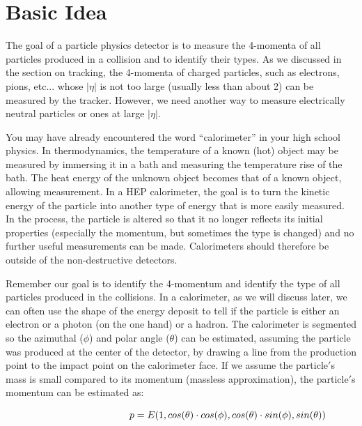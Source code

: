\section{Basic Idea}

\noindent
The goal of a particle physics detector is to measure the 4-momenta of all particles produced in a collision and to identify their types.  As we discussed in the section on tracking, the 4-momenta of charged particles, such as electrons, pions, etc... whose $\left | \eta  \right |$ is not too large (usually less than about 2) can be measured by the tracker. 
However, we need another way to measure electrically neutral particles or ones at large $\left | \eta  \right |$.

\;
\noindent
You may have already encountered the word ``calorimeter'' in your high school physics.  In thermodynamics, the temperature of a known (hot) object may be measured by immersing it in a bath and measuring the temperature rise of the bath.  The heat energy of the unknown object becomes that of a known object, allowing measurement. In a HEP calorimeter, the goal is to turn the kinetic energy of the particle into another type of energy that is more easily measured. In the process, the particle is altered so that it no longer reflects its initial properties (especially the momentum, but sometimes the type is changed) and no further useful measurements can be made.  Calorimeters should therefore be outside of the non-destructive detectors.

\;
\noindent
Remember our goal is to identify the 4-momentum and identify the type of all particles produced in the collisions. In a calorimeter, as we will discuss later, we can often use the shape of the energy deposit to tell if the particle is  either an electron or a photon (on the one hand) or a hadron. The calorimeter is segmented so the azimuthal ($\phi$) and polar angle ($\theta$) can be estimated, assuming the particle was produced at the center of the detector, by drawing a line from the production point to the impact point on the calorimeter face. If we assume the particle$'$s mass is small compared to its momentum (massless approximation), the particle$'$s momentum can be estimated as:

\begin{equation}\hspace{34 mm}
p = E(1,cos(\theta ) \cdot cos(\phi ),cos(\theta ) \cdot sin(\phi ),sin(\theta ))
\end{equation}

\;
\;

